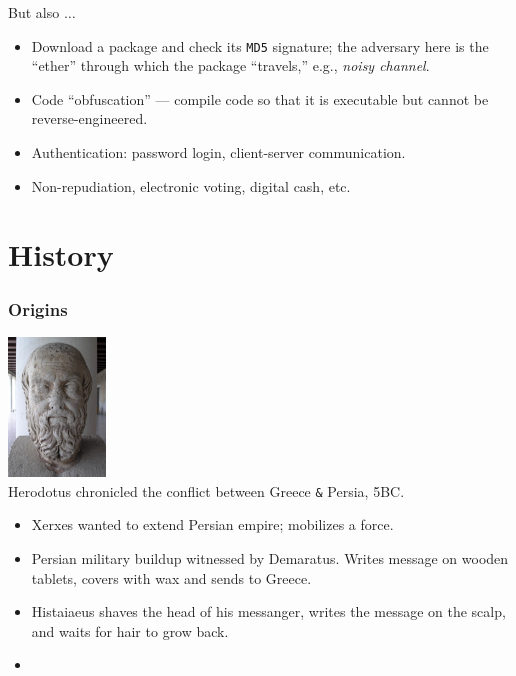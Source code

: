 \begin{frame}

But also $\ldots$

\begin{itemize}

\item  Download a package and check its {\tt MD5} signature; the
adversary here is the ``ether'' through which the package ``travels,''
e.g., {\em noisy channel}.

\item  Code ``obfuscation'' --- compile code so that it is executable
but cannot be reverse-engineered.

\item  Authentication: password login, client-server communication.

\item  Non-repudiation, electronic voting, digital cash, etc.
\end{itemize}
\end{frame}

\section{History}

\begin{frame}
\frametitle{Origins}

\begin{minipage}{3cm}
\raggedright
\includegraphics[width=2.6cm]{Figures/Herodotus.jpg} \\
\footnotesize
Herodotus chronicled the conflict between Greece \texttt{\&} Persia, 5BC.
\end{minipage}
\begin{minipage}{7cm}
\raggedright
\begin{itemize}
\item  Xerxes wanted to extend Persian empire; mobilizes a force.

\item  Persian military buildup witnessed by Demaratus.  Writes
message on wooden tablets, covers with wax and sends to Greece.

\item  Histaiaeus shaves the head of his messanger, writes the message
on the scalp, and waits for hair to grow back.

\item  {}
\end{itemize}
\end{minipage}
\end{frame}

